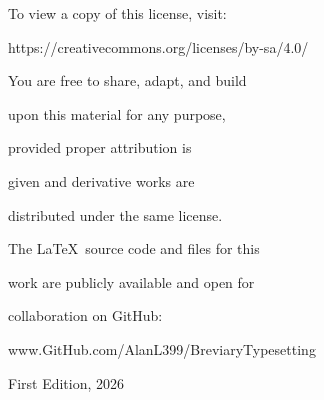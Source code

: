 \documentclass[openany]{book}
\renewcommand{\\}{\par\hspace*{.25em}} %
\newcommand{\ubchapter}[1]{%
	\chapter*{}
	\addcontentsline{toc}{chapter}{#1}%
	\renewcommand{\leftmark}{#1}%
	\phantomsection%
	\hypertarget{#1}{}%
	\vspace{+\baselineskip}%
}
\newcommand{\ubsection}[2]{%
	\section*{#1}%
	\renewcommand{\rightmark}{#1}%
	\phantomsection%
	\addcontentsline{toc}{section}{#1}%
	\hypertarget{#2}{}%
}
\renewcommand{\newline}{\par}
\begin{document}
\begin{center}

\newline To view a copy of this license, visit:
\newline https://creativecommons.org/licenses/by-sa/4.0/
\end{center}
\begin{center}

You are free to share, adapt, and build
\newline upon this material for any purpose,
\newline provided proper attribution is
\newline given and derivative works are
\newline distributed under the same license.
\end{center}
\begin{center}

\newline The \LaTeX \ source code and files for this
\newline work are publicly available and open for
\newline collaboration on GitHub:
\newline www.GitHub.com/AlanL399/BreviaryTypesetting
\end{center}
\begin{center}

First Edition, 2026
\end{center}

{}
\tableofcontents







\end{document}
